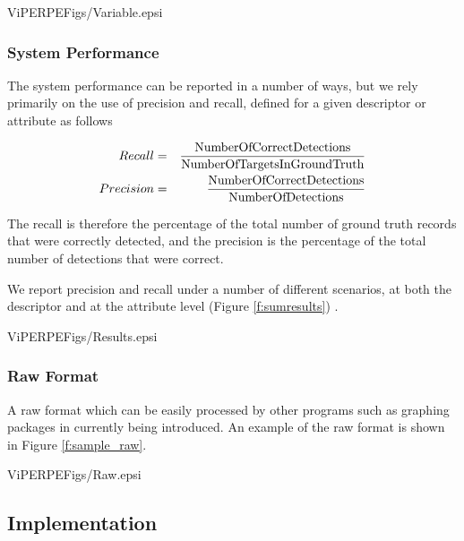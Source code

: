 \begin{putfig}{ViPERPEFigs/Variable.epsi}
\caption{Variable Results Output}
\label{f:var_results}
\end{putfig}



\subsubsection{System Performance}

The system performance can be reported in a number of ways, but we
rely primarily on the use of precision and recall, defined for a given
descriptor or attribute as follows

\begin{eqnarray}
        Recall & = & \frac{\rm Number Of Correct Detections}
                          {\rm Number Of Targets In Ground Truth}\\ 
        Precision & = & \frac{\rm Number Of Correct Detections}{\rm Number Of Detections}
\end{eqnarray}

The recall is therefore the percentage of the total number of ground
truth records that were correctly detected, and the precision is the
percentage of the total number of detections that were correct.

We report precision and recall under a number of different scenarios,
at both the descriptor and at the attribute level (Figure \ref{f:sumresults})
.


\begin{putfig}{ViPERPEFigs/Results.epsi}
\caption{Summary Results Output}
\label{f:sumresults}
\end{putfig}



\subsubsection{Raw Format}

A raw format which can be easily processed by other programs such as
graphing packages in currently being introduced.  An example of the
raw format is shown in Figure \ref{f:sample_raw}.

\begin{putfig}{ViPERPEFigs/Raw.epsi}
\caption{Sample Raw Output}
\label{f:sample_raw}
\end{putfig}

\subsection{Implementation}

